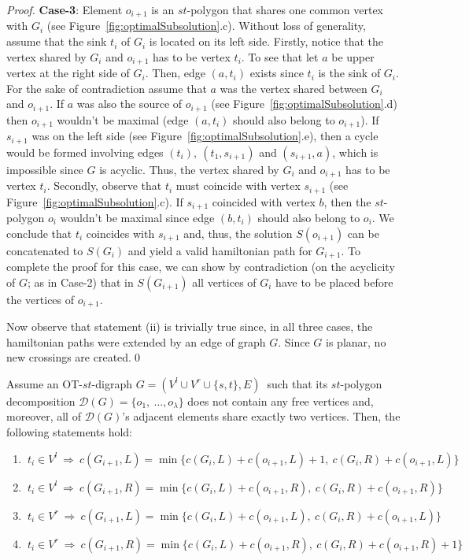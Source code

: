 \documentclass{myllncs-mixalis}
\begin{document}
\begin{proof}
\textbf{Case-3}: Element $o_{i+1}$ is an $st$-polygon that shares
one common vertex with $G_i$ (see
Figure~\ref{fig:optimalSubsolution}.c). Without loss of generality,
assume that the sink $t_i$ of $G_i$ is located on its left side.
Firstly, notice that the  vertex shared by $G_i$ and $o_{i+1}$ has
to be vertex $t_i$. To see that let $a$ be upper vertex at the right
side of $G_i$. Then, edge $(a,t_i)$ exists since $t_i$ is the sink
of $G_i$. For the sake of contradiction assume that $a$ was the
vertex shared between $G_i$ and $o_{i+1}$. If $a$ was also the
source of $o_{i+1}$ (see Figure~\ref{fig:optimalSubsolution}.d) then
$o_{i+1}$ wouldn't be maximal (edge $(a,t_i)$ should also belong to
$o_{i+1}$). If  $s_{i+1}$ was on the left side (see
Figure~\ref{fig:optimalSubsolution}.e), then a cycle would be formed
involving edges $(t_i),~(t_1, s_{i+1})$ and $(s_{i+1},a)$, which is
impossible since $G$ is acyclic. Thus, the vertex shared by $G_i$
and $o_{i+1}$ has to be vertex $t_i$. Secondly, observe that $t_i$
must coincide with vertex $s_{i+1}$ (see
Figure~\ref{fig:optimalSubsolution}.c). If $s_{i+1}$ coincided with
vertex $b$, then the $st$-polygon $o_i$ wouldn't be maximal since
edge $(b,t_i)$ should also belong to $o_{i}$. We conclude that $t_i$
coincides with $s_{i+1}$ and, thus, the solution $S(o_{i+1})$ can be
concatenated to $S(G_i)$ and yield a valid hamiltonian path for
$G_{i+1}$. To complete the proof for this case, we can show by
contradiction (on the acyclicity of $G$; as in Case-2)  that in
$S(G_{i+1})$ all vertices of $G_i$ have to be placed before the
vertices of $o_{i+1}$.

Now observe that statement (ii) is trivially true since, in all
three cases, the hamiltonian paths were extended by an edge of graph
$G$. Since $G$ is planar, no new crossings are created.\qed
\end{proof}

\begin{lemma}
\label{lem:dynProgSolution} Assume an  OT-$st$-digraph $G=(V^l \cup
V^r \cup \{s,t\}, E)~$ such that
 its  $st$-polygon decomposition
$\mathcal{D}(G)= \{ o_1,~ \ldots, o_\lambda \}$ does not contain any
free vertices and, moreover, all of $\mathcal{D}(G)$'s adjacent
elements share exactly two vertices.  Then, the following statements
hold:\vspace*{-.5cm}
\begin{enumerate}[(1)]
\item $~t_{i} \in V^l ~\Rightarrow~ c(G_{i+1},L)=\min \{
    c(G_{i},L)+c(o_{i+1},L)+1,~
    c(G_{i},R)+c(o_{i+1},L)
\} $
\item $~t_{i} \in V^l ~\Rightarrow~  c(G_{i+1},R)=\min \{
    c(G_{i},L)+c(o_{i+1},R),~
    c(G_{i},R)+c(o_{i+1},R)
\} $
\item $~t_{i} \in V^r ~\Rightarrow~  c(G_{i+1},L)=\min \{
    c(G_{i},L)+c(o_{i+1},L),~
    c(G_{i},R)+c(o_{i+1},L)
\} $
\item $~t_{i} \in V^r ~\Rightarrow~  c(G_{i+1},R)=\min \{
    c(G_{i},L)+c(o_{i+1},R),~
    c(G_{i},R)+c(o_{i+1},R)+1
\} $
\end{enumerate}
\end{lemma}
\end{document}
